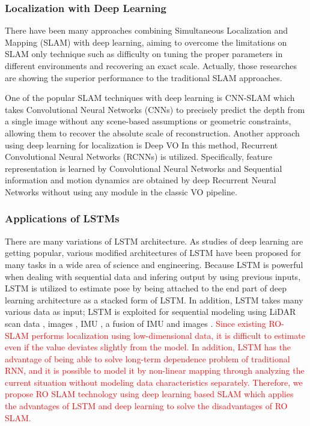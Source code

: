 \documentclass[letterpaper, 10 pt, conference]{ieeeconf}  %
\begin{document}
\subsubsection{Localization with Deep Learning}
There have been many approaches combining Simultaneous Localization and Mapping (SLAM) with deep learning, aiming to overcome the limitations on SLAM only technique such as difficulty on tuning the proper parameters in different environments and recovering an exact scale. Actually, those researches are showing the superior performance to the traditional SLAM approaches.

One of the popular SLAM techniques with deep learning is CNN-SLAM \cite{tateno2017cnn} which takes Convolutional Neural Networks (CNNs) to precisely predict the depth from a single image without any scene-based assumptions or geometric constraints, allowing them to recover the absolute scale of reconstruction. Another approach using deep learning for localization is Deep VO \cite{clark2017vinet} In this method, Recurrent Convolutional Neural Networks (RCNNs) is utilized. Specifically, feature representation is learned by Convolutional Neural Networks and Sequential information and motion dynamics are obtained by deep Recurrent Neural Networks without using any module in the classic VO pipeline.

\subsubsection{Applications of LSTMs}

There are many variations of LSTM architecture. As studies of deep learning are getting popular, various modified architectures of LSTM have been proposed for many tasks in a wide area of science and engineering. Because LSTM is powerful when dealing with sequential data and infering output by using previous inputs, LSTM is utilized to estimate pose by being attached to the end part of deep learning architecture \cite{wang2017deepvo, kendall2015posenet, turan2018deep}  as a stacked form of LSTM. In addition, LSTM takes many various data as input; LSTM is exploited for sequential modeling using LiDAR scan data \cite{gladh2016deep}, images \cite{walch2017image, wang2017deepvo}, IMU \cite{ordonez2016deep}, a fusion of IMU and images \cite{clark2017vinet}. \textcolor{red}{Since existing RO-SLAM performs localization using low-dimensional data, it is difficult to estimate even if the value deviates slightly from the model. In addition, LSTM has the advantage of being able to solve long-term dependence problem of traditional RNN, and it is possible to model it by non-linear mapping through analyzing the current situation without modeling data characteristics separately. Therefore, we propose RO SLAM technology using deep learning based SLAM which applies the advantages of LSTM and deep learning to solve the disadvantages of RO SLAM.}
\end{document}
